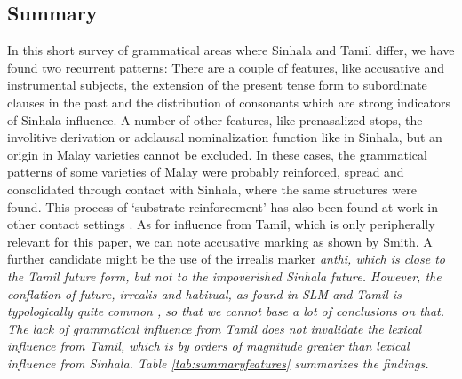 \documentclass[a4paper,10pt]{article}
\newcommand{\T}{\tz}
\begin{document}
%   
% 
%  


\subsection{Summary}
In this short survey of grammatical areas where Sinhala and Tamil differ, we have found two recurrent patterns: There are a couple of features, like accusative and instrumental subjects, the extension of the present tense form to subordinate clauses in the past and  the distribution of consonants which are strong indicators of Sinhala influence. A number of other features, like   prenasalized stops, the involitive derivation or adclausal nominalization function like in Sinhala, but an origin in Malay varieties cannot be excluded. In these cases, the grammatical patterns of some varieties of Malay were probably reinforced, spread and consolidated through contact with Sinhala, where the same structures were found. This process of `substrate reinforcement' has also been found at work in other contact settings \citep{Siegel1998substrate,Siegel1999melanesian,Siegel2000lis,Siegel2008cafeteria}. 
As for influence from Tamil, which is only peripherally relevant for this paper, we can note accusative marking as shown by Smith. A further candidate might be the use of the irrealis marker \em anthi\em, which is close to the Tamil future form, but not to the impoverished Sinhala future. However, the conflation of future, irrealis and habitual, as found in SLM and Tamil is typologically quite common \citep{Givon1994sil}, so that we cannot base a lot of conclusions on that. The lack of grammatical influence from Tamil does not invalidate the lexical influence from Tamil, which is by orders of magnitude greater than lexical influence from Sinhala. Table \ref{tab:summaryfeatures} summarizes the findings.
\end{document}
